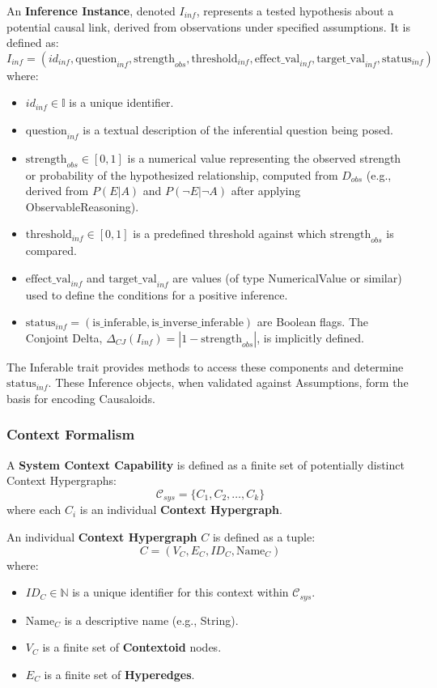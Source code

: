 \newpage

An \textbf{Inference Instance}, denoted $I_{inf}$, represents a tested hypothesis about a potential causal link, derived from observations under specified assumptions. It is defined as:
\[ I_{inf} = (id_{inf}, \text{question}_{inf}, \text{strength}_{obs}, \text{threshold}_{inf}, \text{effect\_val}_{inf}, \text{target\_val}_{inf}, \text{status}_{inf}) \] %
where:
\begin{itemize}
    \item $id_{inf} \in \mathbb{I}$ is a unique identifier.
    \item $\text{question}_{inf}$ is a textual description of the inferential question being posed.
    \item $\text{strength}_{obs} \in [0,1]$ is a numerical value representing the observed strength or probability of the hypothesized relationship, computed from $D_{obs}$ (e.g., derived from $P(E|A)$ and $P(\neg E|\neg A)$ after applying ObservableReasoning).
    \item $\text{threshold}_{inf} \in [0,1]$ is a predefined threshold against which $\text{strength}_{obs}$ is compared.
    \item $\text{effect\_val}_{inf}$ and $\text{target\_val}_{inf}$ are values (of type NumericalValue or similar) used to define the conditions for a positive inference.
    \item $\text{status}_{inf} = (\text{is\_inferable}, \text{is\_inverse\_inferable})$ are Boolean flags. The Conjoint Delta, $\Delta_{CJ}(I_{inf}) = |1 - \text{strength}_{obs}|$, is implicitly defined.
\end{itemize}
The Inferable trait provides methods to access these components and determine $\text{status}_{inf}$. These Inference objects, when validated against Assumptions, form the basis for encoding Causaloids.

\subsubsection{Context Formalism}
\label{subsubsec:context_formalism_main} %

A \textbf{System Context Capability} is defined as a finite set of potentially distinct Context Hypergraphs:
\[ \mathcal{C}_{sys} = \{C_1, C_2, \dots, C_k\} \]
where each $ C_i $ is an individual \textbf{Context Hypergraph}.

An individual \textbf{Context Hypergraph} $ C $ is defined as a tuple:
\[ C = (V_C, E_C, ID_C, \text{Name}_C) \]
where:
\begin{itemize}
    \item $ ID_C \in \mathbb{N} $ is a unique identifier for this context within $ \mathcal{C}_{sys} $.
    \item $ \text{Name}_C $ is a descriptive name (e.g., String).
    \item $ V_C $ is a finite set of \textbf{Contextoid} nodes.
    \item $ E_C $ is a finite set of \textbf{Hyperedges}.
\end{itemize}

